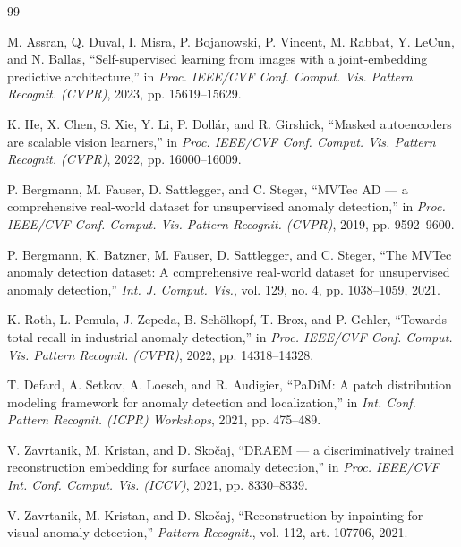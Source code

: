 \documentclass[12pt,a4paper,oneside]{report}
\begin{document}
\clearpage
{}
\begin{thebibliography}{99}

 M. Assran, Q. Duval, I. Misra, P. Bojanowski, P. Vincent, M. Rabbat, Y. LeCun, and N. Ballas, ``Self-supervised learning from images with a joint-embedding predictive architecture,'' in \textit{Proc. IEEE/CVF Conf. Comput. Vis. Pattern Recognit. (CVPR)}, 2023, pp. 15619--15629.

 K. He, X. Chen, S. Xie, Y. Li, P. Doll\'ar, and R. Girshick, ``Masked autoencoders are scalable vision learners,'' in \textit{Proc. IEEE/CVF Conf. Comput. Vis. Pattern Recognit. (CVPR)}, 2022, pp. 16000--16009.

 P. Bergmann, M. Fauser, D. Sattlegger, and C. Steger, ``MVTec AD --- a comprehensive real-world dataset for unsupervised anomaly detection,'' in \textit{Proc. IEEE/CVF Conf. Comput. Vis. Pattern Recognit. (CVPR)}, 2019, pp. 9592--9600.

 P. Bergmann, K. Batzner, M. Fauser, D. Sattlegger, and C. Steger, ``The MVTec anomaly detection dataset: A comprehensive real-world dataset for unsupervised anomaly detection,'' \textit{Int. J. Comput. Vis.}, vol. 129, no. 4, pp. 1038--1059, 2021.

 K. Roth, L. Pemula, J. Zepeda, B. Sch\"olkopf, T. Brox, and P. Gehler, ``Towards total recall in industrial anomaly detection,'' in \textit{Proc. IEEE/CVF Conf. Comput. Vis. Pattern Recognit. (CVPR)}, 2022, pp. 14318--14328.

 T. Defard, A. Setkov, A. Loesch, and R. Audigier, ``PaDiM: A patch distribution modeling framework for anomaly detection and localization,'' in \textit{Int. Conf. Pattern Recognit. (ICPR) Workshops}, 2021, pp. 475--489.

 V. Zavrtanik, M. Kristan, and D. Sko\v{c}aj, ``DRAEM --- a discriminatively trained reconstruction embedding for surface anomaly detection,'' in \textit{Proc. IEEE/CVF Int. Conf. Comput. Vis. (ICCV)}, 2021, pp. 8330--8339.

 V. Zavrtanik, M. Kristan, and D. Sko\v{c}aj, ``Reconstruction by inpainting for visual anomaly detection,'' \textit{Pattern Recognit.}, vol. 112, art. 107706, 2021.


\end{thebibliography}
\end{document}

